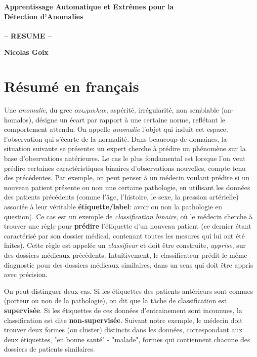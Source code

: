 \documentclass[a4paper, 12pt]{article}
\begin{document}
\begin{center}
{\large \textbf{Apprentissage Automatique et Extrêmes pour la \\ Détection d'Anomalies \\~\\-- RESUME --\\}}
\vspace{1em}

\textbf{Nicolas Goix}
\end{center}


\section{Résumé en français}
Une \emph{anomalie}, du grec $\alpha \nu \omega \mu \alpha \lambda \iota \alpha $, aspérité, irrégularité, non semblable (an-homalos), désigne un écart par rapport à une certaine norme, reflétant le comportement attendu.
On appelle \emph {anomalie} l'objet qui induit cet espace, l'observation qui s'écarte de la normalité.
%
Dans beaucoup de domaines, la situation suivante se présente: un expert cherche à prédire un phénomène sur la base d'observations antérieures. Le cas le plus fondamental est lorsque l'on veut prédire certaines caractéristiques binaires d'observations nouvelles, compte tenu des précédentes. Par exemple, on peut penser à un médecin voulant prédire si un nouveau patient présente ou non une certaine pathologie, en utilisant les données des patients précédents (comme l'âge, l'histoire, le sexe, la pression artérielle) associée à leur véritable \textbf{étiquette/label}: avoir ou non la pathologie en question). Ce cas est un exemple de \emph {classification binaire}, où le médecin cherche à trouver une règle pour \textbf {prédire} l'étiquette d'un nouveau patient (ce dernier étant caractérisé par son dossier médical, contenant toutes les mesures qui lui ont été faites). Cette règle est appelée un \emph{classifieur} et doit être construite, \emph{apprise}, sur des dossiers médicaux précédents. %
Intuitivement, le classificateur prédit le même diagnostic pour des dossiers médicaux similaires, dans un sens qui doit être appris avec précision.

On peut distinguer deux cas. Si les étiquettes des patients antérieurs sont connues (porteur ou non de la pathologie), on dit que la tâche de classification est \textbf {supervisée}. Si les étiquettes de ces données d'entrainement sont inconnues, la classification est dite \textbf {non-supervisée}. Suivant notre exemple, le médecin doit trouver deux formes (ou cluster) distincts dans les données, correspondant aux deux étiquettes, "en bonne santé" - "malade", formes qui contiennent chacune des dossiers de patients similaires.
\end{document}

